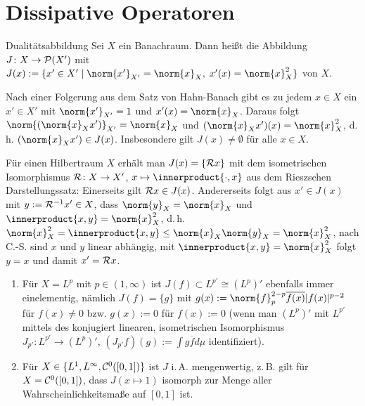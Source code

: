 \section{%
    Dissipative Operatoren%
}

\begin{Def}{Dualitätsabbildung}
    Sei $X$ ein Banachraum.
    Dann heißt die Abbildung $J\colon X \to \P(X')$ mit
    $J(x) := \{x' \in X' \;|\; \norm{x'}_{X'} = \norm{x}_X,\; x'(x) = \norm{x}_X^2\}$
     von $X$.
\end{Def}

\linie

\begin{Bem}
    Nach einer Folgerung aus dem Satz von Hahn-Banach gibt es zu jedem $x \in X$
    ein $x' \in X'$ mit $\norm{x'}_{X'} = 1$ und
    $x'(x) = \norm{x}_X$.
    Daraus folgt $\norm{(\norm{x}_X x')}_{X'} = \norm{x}_X$ und
    $(\norm{x}_X x')(x) = \norm{x}_X^2$, d.\,h. $(\norm{x}_X x') \in J(x)$.
    Insbesondere gilt $J(x) \not= \emptyset$ für alle $x \in X$.
\end{Bem}

\begin{Bem}
    Für einen Hilbertraum $X$ erhält man $J(x) = \{\R x\}$ mit dem isometrischen Isomorphismus
    $\R\colon X \to X'$, $x \mapsto \innerproduct{\cdot, x}$ aus dem Rieszschen Darstellungssatz:
    Einerseits gilt $\R x \in J(x)$.
    Andererseits folgt aus $x' \in J(x)$ mit $y := \R^{-1} x' \in X$,
    dass $\norm{y}_X = \norm{x}_X$ und $\innerproduct{x, y} = \norm{x}_X^2$,
    d.\,h. $\norm{x}_X^2 = \innerproduct{x, y} \le \norm{x}_X \norm{y}_X = \norm{x}_X^2$,
    nach C.-S. sind $x$ und $y$ linear abhängig, mit $\innerproduct{x, y} = \norm{x}_X^2$ folgt $y = x$
    und damit $x' = \R x$.
\end{Bem}

\begin{Bsp}
    \begin{enumerate}
        \item
        Für $X = L^p$ mit $p \in (1, \infty)$ ist $J(f) \subset L^{p'} \cong (L^p)'$ ebenfalls immer
        einelementig, nämlich $J(f) = \{g\}$ mit
        $g(x) := \norm{f}_p^{2-p} \overline{f(x)} |f(x)|^{p-2}$ für $f(x) \not= 0$
        bzw. $g(x) := 0$ für $f(x) := 0$
        (wenn man $(L^p)'$ mit $L^{p'}$ mittels des konjugiert linearen, isometrischen Isomorphismus
        $J_{p'}\colon L^{p'} \to (L^p)'$, $(J_{p'} f)(g) := \int g \overline{f} d\mu$
        identifiziert).

        \item
        Für $X \in \{L^1, L^\infty, \C^0([0, 1])\}$ ist $J$ i.\,A. mengenwertig,
        z.\,B. gilt für $X = \C^0([0, 1])$, dass $J(x \mapsto 1)$
        isomorph zur Menge aller Wahrscheinlichkeitsmaße auf $[0, 1]$ ist.
    \end{enumerate}
\end{Bsp}

